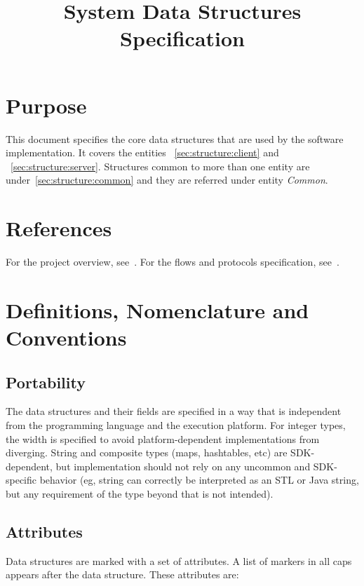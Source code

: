 \documentclass[a4paper,10pt]{article}
\title{\longProduct{} System Data Structures Specification}
\newcommand{\common}{{\em Common}}
\begin{document}
\maketitle
\tableofcontents

\section{Purpose}
This document specifies the core data structures that are used by the \shortProduct{} software implementation. It covers the entities \client{}~\ref{sec:structure:client} and 
\server{}~\ref{sec:structure:server}. Structures common to more than one entity are under~\ref{sec:structure:common} and they are referred under entity \common{}.

\section{References}
For the project overview, see~\cite{project_spec}. For the flows and protocols specification, see~\cite{flow_spec}.

\section{Definitions, Nomenclature and Conventions}

\subsection{Portability}
The data structures and their fields are specified in a way that is independent from the programming language and the execution platform. For integer types, the width is specified 
to avoid platform-dependent implementations from diverging. String and composite types (maps, hashtables, etc) are SDK-dependent, but implementation should not rely on any uncommon 
and SDK-specific behavior (eg, string can correctly be interpreted as an STL or Java string, but any requirement of the type beyond that is not intended).

\subsection{Attributes}
Data structures are marked with a set of attributes. A list of markers in all caps appears after the data structure. These attributes are:

\newcommand{\persistent}{\MakeUppercase{persistent}}
\newcommand{\ephemeral}{\MakeUppercase{ephemeral}}
\newcommand{\secure}{\MakeUppercase{secure}}
\newcommand{\unsecure}{\MakeUppercase{unsecure}}
\newcommand{\infrastructure}{\MakeUppercase{infrastructure}}
\newcommand{\unique}{\MakeUppercase{unique}}
\end{document}
